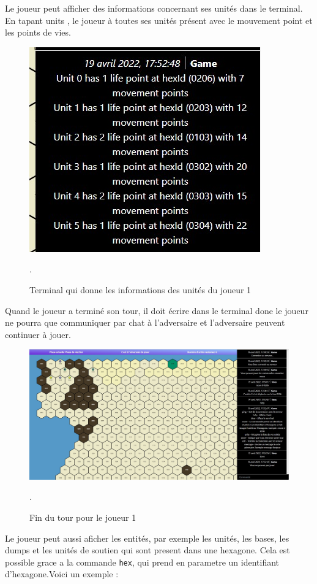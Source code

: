 Le joueur peut afficher des informations concernant ses unités dans le terminal.
En tapant \og units \fg{}, le joueur à toutes ses unités présent avec le mouvement point et  les points de vies.\\
\begin{figure}[H]
\centering
\includegraphics[scale=0.6]{data/info_units.jpg}
\caption{Terminal qui donne les informations des unités du joueur 1 }.
\end{figure}

Quand le joueur a terminé son tour, il doit écrire dans le terminal \og done \fg{}
le joueur ne pourra que communiquer par chat à l'adversaire et l'adversaire peuvent continuer à jouer.\\
\begin{figure}[H]
\centering
\includegraphics[scale=0.35]{data/fin_tour.jpg}
\caption{Fin du tour pour le joueur 1}.
\end{figure}


Le joueur peut aussi aficher les entités, par exemple les unités, les bases, les dumps et les unités de soutien qui sont present dans une hexagone. 
Cela est possible grace a la commande {\tt hex}, qui prend en parametre un identifiant d'hexagone.Voici un exemple :\\


